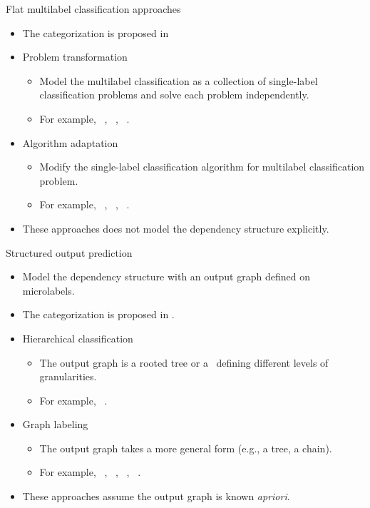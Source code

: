 \documentclass[first=dgreen,second=purple,logo=yellowexc]{aaltoslides}
\begin{document}
%
\begin{frame}{Flat multilabel classification approaches}
	\begin{itemize}\footnotesize
		\item The categorization is proposed in \cite{Tsoumakas10mining}
		\item Problem transformation
		\begin{itemize}\footnotesize
			\item Model the multilabel classification as a collection of single-label classification problems and solve each problem independently.
			\item For example, \mlknn\ \cite{Zhang07mlknn}, \cc\ \cite{Read09classifier,Read11classifier}, \iblr\ \cite{Cheng09combining}.
		\end{itemize}
		\item Algorithm adaptation 
		\begin{itemize}\footnotesize
			\item Modify the single-label classification algorithm for multilabel classification problem.
			\item For example, \adaboostmh\ \cite{Schapire99improved,Esuli2008boosting}, \corrlog\ \cite{Bian12corrlog}, \mtl\ \cite{Argyriou08convex}.
		\end{itemize}
		\item These approaches does not model the dependency structure explicitly.
	\end{itemize}
\end{frame}

%
\begin{frame}{Structured output prediction}
	\begin{itemize}\footnotesize
		\item Model the dependency structure with an output graph defined on microlabels.
		\item The categorization is proposed in \cite{Su2014Multilabel}.
		\item Hierarchical classification
		\begin{itemize}\footnotesize
			\item The output graph is a rooted tree or a \daggraph\ defining different levels of granularities.
			\item For example, \svmstruct\ \cite{THJA04,TJTA05}.
		\end{itemize}
		\item Graph labeling
		\begin{itemize}\footnotesize
			\item The output graph takes a more general form (e.g., a tree, a chain).
			\item For example, \crf\ \cite{lafferty01,taskar02}, \mmmn\ \cite{Taskar04max}, \mmcrf\ \cite{Rousu07, su10structured}, \spin\ \cite{su14structured}.
		\end{itemize}
		\item These approaches assume the output graph is known {\em apriori}.
	\end{itemize}
\end{frame}
\end{document}
